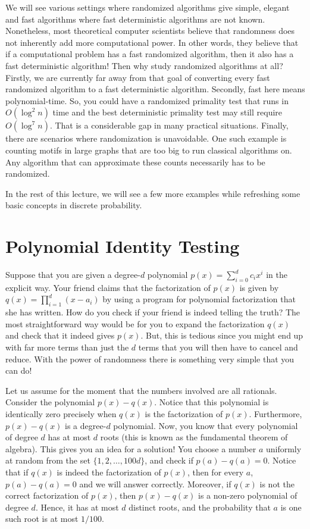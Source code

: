 We will see various settings where randomized algorithms give simple, elegant and fast algorithms where fast deterministic algorithms are not known. Nonetheless, most theoretical computer scientists believe that randomness does not inherently add more computational power. In other words, they believe that if a computational problem has a fast randomized algorithm, then it also has a fast deterministic algorithm! Then why study randomized algorithms at all? Firstly, we are currently far away from that goal of converting every fast randomized algorithm to a fast deterministic algorithm. Secondly, fast here means polynomial-time. So, you could have a randomized primality test that runs in $O(\log^2 n)$ time and the best deterministic primality test may still require $O(\log^7 n)$. That is a considerable gap in many practical situations. Finally, there are scenarios where randomization is unavoidable. One such example is counting motifs in large graphs that are too big to run classical algorithms on. Any algorithm that can approximate these counts necessarily has to be randomized. 

In the rest of this lecture, we will see a few more examples while refreshing some basic concepts in discrete probability.

\section{Polynomial Identity Testing}

Suppose that you are given a degree-$d$ polynomial $p(x) = \sum_{i=0}^d c_i x^i$ in the explicit way. Your friend claims that the factorization of $p(x)$ is given by $q(x) = \prod_{i=1}^d (x-a_i)$ by using a program for polynomial factorization that she has written. How do you check if your friend is indeed telling the truth? The most straightforward way would be for you to expand the factorization $q(x)$ and check that it indeed gives $p(x)$. But, this is tedious since you might end up with far more terms than just the $d$ terms that you will then have to cancel and reduce. With the power of randomness there is something very simple that you can do!

Let us assume for the moment that the numbers involved are all
rationals. Consider the polynomial $p(x) -q(x)$. Notice that this polynomial is
identically zero precisely when $q(x)$ is the factorization of
$p(x)$. Furthermore, $p(x) - q(x)$ is a degree-$d$ polynomial. Now, you know
that every polynomial of degree $d$ has at most $d$ roots (this is known as the
fundamental theorem of algebra). This gives you an idea for a solution! You
choose a number $a$ uniformly at random from the set $\{1,2,\ldots,100d\}$, and
check if $p(a)-q(a)=0$. Notice that if $q(x)$ is indeed the factorization of
$p(x)$, then for every $a$, $p(a) - q(a)=0$ and we will answer
correctly. Moreover, if $q(x)$ is not the correct factorization of $p(x)$, then
$p(x)-q(x)$ is a non-zero polynomial of degree $d$. Hence, it has at most $d$
distinct roots, and the probability that $a$ is one such root is at most
$1/100$.

